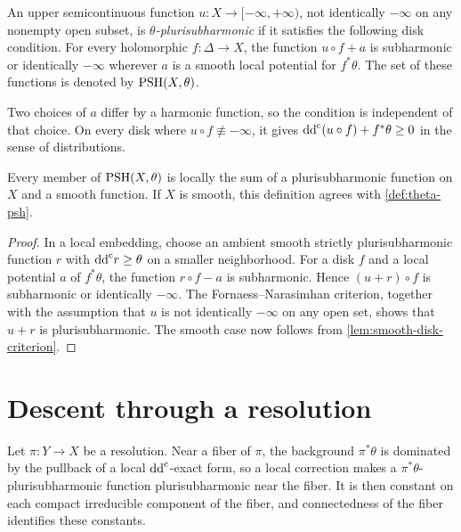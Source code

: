 \begin{definition}\label{def:space-theta-psh}
An upper semicontinuous function $u\colon X\to[-\infty,+\infty)$, not identically $-\infty$ on any nonempty open subset, is \emph{$\theta$-plurisubharmonic} if it satisfies the following disk condition. For every holomorphic $f\colon \Delta\to X$, the function $u\circ f+a$ is subharmonic or identically $-\infty$ wherever $a$ is a smooth local potential for $f^*\theta$. The set of these functions is denoted by $\mathrm{PSH}(X,\theta)$.
\end{definition}

Two choices of $a$ differ by a harmonic function, so the condition is independent of that choice. On every disk where $u\circ f\not\equiv-\infty$, it gives $\mathrm{dd}^{\mathrm{c}}(u\circ f)+f^*\theta\geq0$ in the sense of distributions.

\begin{lemma}\label{lem:space-local-correction}
Every member of $\mathrm{PSH}(X,\theta)$ is locally the sum of a plurisubharmonic function on $X$ and a smooth function. If $X$ is smooth, this definition agrees with \cref{def:theta-psh}.
\end{lemma}
\begin{proof}
In a local embedding, choose an ambient smooth strictly plurisubharmonic function $r$ with $\mathrm{dd}^{\mathrm{c}} r\geq\theta$ on a smaller neighborhood. For a disk $f$ and a local potential $a$ of $f^*\theta$, the function $r\circ f-a$ is subharmonic. Hence $(u+r)\circ f$ is subharmonic or identically $-\infty$. The Fornaess--Narasimhan criterion, together with the assumption that $u$ is not identically $-\infty$ on any open set, shows that $u+r$ is plurisubharmonic. The smooth case now follows from \cref{lem:smooth-disk-criterion}.
\end{proof}

\section{Descent through a resolution}

Let $\pi\colon Y\to X$ be a resolution. Near a fiber of $\pi$, the background $\pi^*\theta$ is dominated by the pullback of a local $\mathrm{dd}^{\mathrm{c}}$-exact form, so a local correction makes a $\pi^*\theta$-plurisubharmonic function plurisubharmonic near the fiber. It is then constant on each compact irreducible component of the fiber, and connectedness of the fiber identifies these constants.

